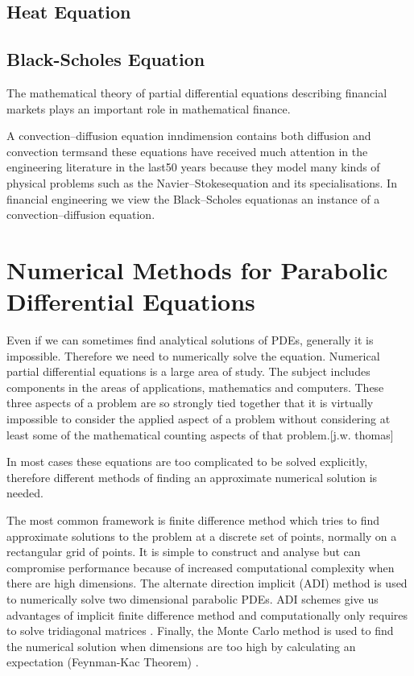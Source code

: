 \documentclass[12pt, oneside]{book}
\theoremstyle{plain}
\theoremstyle{definition}
\begin{document}
\subsection{Heat Equation}

\subsection{Black-Scholes Equation}
The mathematical theory of partial differential equations describing financial markets plays an important role in mathematical finance.

A convection–diffusion equation inndimension contains both diffusion and convection termsand  these  equations  have  received  much  attention  in  the  engineering  literature  in  the  last50 years because they model many kinds of physical problems such as the Navier–Stokesequation and its specialisations. In financial engineering we view the Black–Scholes equationas an instance of a convection–diffusion equation.


\section{Numerical Methods for Parabolic Differential Equations}
Even if we can sometimes find analytical solutions of PDEs, generally it is impossible. Therefore we need to numerically solve the equation. Numerical partial differential equations is a large area of study. The subject includes components in the areas of applications, mathematics and computers. These three aspects of a problem are so strongly tied together that it is virtually impossible to consider the applied aspect of a problem without considering at least some of the mathematical counting aspects of that problem.[j.w. thomas]

 In most cases these equations are too complicated to be solved explicitly, therefore different methods of finding an approximate numerical solution is needed.

The most common framework is finite difference method which tries to find approximate solutions to the problem at a discrete set of points, normally on a rectangular grid of points. It is simple to construct and analyse but can compromise performance because of increased computational complexity when there are high dimensions. The alternate direction implicit (ADI) method is used to numerically solve two dimensional parabolic PDEs. ADI schemes give us advantages of implicit finite difference method and computationally only requires to solve tridiagonal matrices \cite{thomas}. Finally, the Monte Carlo method is used to find the numerical solution when dimensions are too high by calculating an expectation (Feynman-Kac Theorem) \cite{klebaner}.
\end{document}
